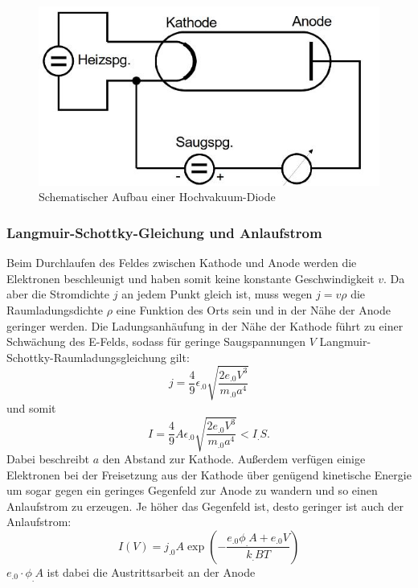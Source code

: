\begin{figure}
\centering
\includegraphics[width=\linewidth-70pt,height=\textheight-70pt,keepaspectratio]{content/images/HVD.jpg}
\caption{Schematischer Aufbau einer Hochvakuum-Diode\cite{V504}
\label{fig:HVD}}
\end{figure}
\subsubsection{Langmuir-Schottky-Gleichung und Anlaufstrom}
Beim Durchlaufen des Feldes zwischen Kathode und Anode werden die Elektronen beschleunigt und haben somit keine konstante Geschwindigkeit $v$.
Da aber die Stromdichte $j$ an jedem Punkt gleich ist, muss wegen $j=v\rho$
die Raumladungsdichte $\rho$ eine Funktion des Orts sein und in der Nähe der Anode geringer werden. Die Ladungsanhäufung in der Nähe der Kathode führt zu einer Schwächung des E-Felds, sodass für geringe Saugspannungen $V$ Langmuir-Schottky-Raumladungsgleichung gilt:
\begin{equation*}
j = \frac{4}{9}\epsilon_.0\sqrt{\frac{2e_.0V^3}{m_.0a^4}}
\end{equation*}
und somit
\begin{equation}
I = \frac{4}{9}A\epsilon_.0\sqrt{\frac{2e_.0V^3}{m_.0a^4}}<I_.S\text{.}
\label{eq:langmuir}
\end{equation}
Dabei beschreibt $a$ den Abstand zur Kathode.
Außerdem verfügen einige Elektronen bei der Freisetzung aus der Kathode über genügend kinetische Energie um sogar gegen ein geringes Gegenfeld zur Anode zu wandern und so einen Anlaufstrom zu erzeugen.
Je höher das Gegenfeld ist, desto geringer ist auch der Anlaufstrom:
\begin{equation}
I(V)=j_.0A\exp{\left(-\frac{e_.0\phi_.A+e_.0V}{k_.B	T}\right)}
\label{eq:Anlauf}
\end{equation}
$e_.0\cdot\phi_.A$ ist dabei die Austrittsarbeit an der Anode

